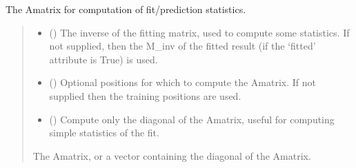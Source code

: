 \documentclass[letterpaper,10pt,english]{sphinxmanual}
\begin{document}
\begin{fulllineitems}
\begin{quote}
\begin{description}
\begin{itemize}
\end{itemize}

\end{description}\end{quote}

\begin{fulllineitems}
\label{\detokenize{splines:glomar_gridding.spline.Spline.A_matrix}}
\pysigstartsignatures
\pysiglinewithargsret
{}
{\sphinxparamcomma {}\sphinxparamcomma {}}
{}
\pysigstopsignatures
\sphinxAtStartPar
The A\sphinxhyphen{}matrix for computation of fit/prediction statistics.
\begin{quote}\begin{description}
\begin{itemize}
\item {}
\sphinxAtStartPar
{} () \textendash{} The inverse of the fitting matrix, used to compute some statistics.
If not supplied, then the M\_inv of the fitted result (if the
‘fitted’ attribute is True) is used.

\item {}
\sphinxAtStartPar
{} () \textendash{} Optional positions for which to compute the A\sphinxhyphen{}matrix. If not
supplied then the training positions are used.

\item {}
\sphinxAtStartPar
{} () \textendash{} Compute only the diagonal of the A\sphinxhyphen{}matrix, useful for computing
simple statistics of the fit.

\end{itemize}

\sphinxAtStartPar
The A\sphinxhyphen{}matrix, or a vector containing the diagonal of the A\sphinxhyphen{}matrix.


\end{description}
\end{quote}
\end{fulllineitems}
\end{fulllineitems}
\end{document}
